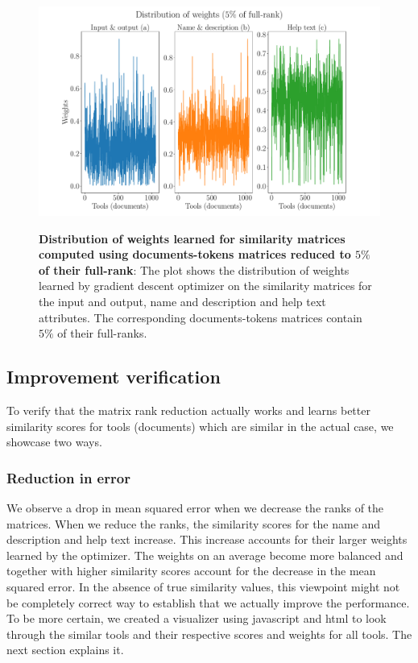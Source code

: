 \begin{figure}[h]
\begin{centering}
    {\includegraphics[scale=0.35]{figures/Weights_005.pdf}}
    \caption[Distribution of weights learned for similarity matrices computed using documents-tokens matrices reduced to $5\%$ of their full-rank]{\textbf{Distribution of weights learned for similarity matrices computed using documents-tokens matrices reduced to $5\%$ of their full-rank}: The plot shows the distribution of weights learned by gradient descent optimizer on the similarity matrices for the input and output, name and description and help text attributes. The corresponding documents-tokens matrices contain $5\%$ of their full-ranks.}
\end{centering}
\end{figure}

\subsection{Improvement verification}
To verify that the matrix rank reduction actually works and learns better similarity scores for tools (documents) which are similar in the actual case, we showcase two ways.

\subsubsection{Reduction in error}
We observe a drop in mean squared error when we decrease the ranks of the matrices. When we reduce the ranks, the similarity scores for the name and description and help text increase. This increase accounts for their larger weights learned by the optimizer. The weights on an average become more balanced and together with higher similarity scores account for the decrease in the mean squared error. In the absence of true similarity values, this viewpoint might not be completely correct way to establish that we actually improve the performance. To be more certain, we created a visualizer using javascript and html to look through the similar tools and their respective scores and weights for all tools. The next section explains it.

